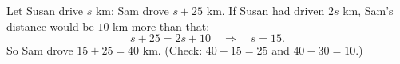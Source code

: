 Let Susan drive $s$ km; Sam drove $s+25$ km. If Susan had driven $2s$ km, Sam's distance would be $10$ km more than that:
\[
s+25=2s+10\quad\Longrightarrow\quad s=15 .
\]
So Sam drove $15+25=\boxed{40}$ km. (Check: $40-15=25$ and $40-30=10$.)
